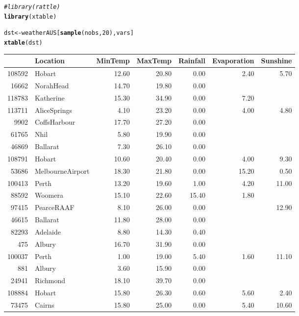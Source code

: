 \documentclass[a4paper]{article}\usepackage[]{graphicx}\usepackage[]{color}
\makeatletter
\newcommand{\hlnum}[1]{\textcolor[rgb]{0.686,0.059,0.569}{#1}}%
\newcommand{\hlcom}[1]{\textcolor[rgb]{0.678,0.584,0.686}{\textit{#1}}}%
\newcommand{\hlstd}[1]{\textcolor[rgb]{0.345,0.345,0.345}{#1}}%
\newcommand{\hlkwb}[1]{\textcolor[rgb]{0.69,0.353,0.396}{#1}}%
\newcommand{\hlkwd}[1]{\textcolor[rgb]{0.737,0.353,0.396}{\textbf{#1}}}%
\newenvironment{kframe}{%
 \def\at@end@of@kframe{}%
 \ifinner\ifhmode%
  \def\at@end@of@kframe{\end{minipage}}%
  \begin{minipage}{\columnwidth}%
 \fi\fi%
 \def\FrameCommand##1{\hskip\@totalleftmargin \hskip-\fboxsep
 \colorbox{shadecolor}{##1}\hskip-\fboxsep
     \hskip-\linewidth \hskip-\@totalleftmargin \hskip\columnwidth}%
 \MakeFramed {\advance\hsize-\width
   \@totalleftmargin\z@ \linewidth\hsize
   \@setminipage}}%
 {\par\unskip\endMakeFramed%
 \at@end@of@kframe}
\makeatother
\begin{document}
\begin{kframe}
\begin{alltt}
\hlcom{#library(rattle)}
\hlkwd{library}\hlstd{(xtable)}
\end{alltt}


{\ttfamily\noindent\color{warningcolor}{\#\# Warning: package 'xtable' was built under R version 3.2.5}}\begin{alltt}
\hlstd{dst} \hlkwb{<-} \hlstd{weatherAUS[}\hlkwd{sample}\hlstd{(nobs,} \hlnum{20}\hlstd{), vars]}
\hlkwd{xtable}\hlstd{(dst)}
\end{alltt}
\end{kframe}%
\begin{table}[ht]
\centering
\begin{tabular}{rlrrrrr}
  \hline
 & Location & MinTemp & MaxTemp & Rainfall & Evaporation & Sunshine \\ 
  \hline
108592 & Hobart & 12.60 & 20.80 & 0.00 & 2.40 & 5.70 \\ 
  16662 & NorahHead & 14.70 & 19.80 & 0.00 &  &  \\ 
  118783 & Katherine & 15.30 & 34.90 & 0.00 & 7.20 &  \\ 
  113711 & AliceSprings & 4.10 & 23.20 & 0.00 & 4.00 & 4.80 \\ 
  9902 & CoffsHarbour & 17.70 & 27.20 & 0.00 &  &  \\ 
  61765 & Nhil & 5.80 & 19.90 & 0.00 &  &  \\ 
  46869 & Ballarat & 7.30 & 26.10 & 0.00 &  &  \\ 
  108791 & Hobart & 10.60 & 20.40 & 0.00 & 4.00 & 9.30 \\ 
  53686 & MelbourneAirport & 18.30 & 21.80 & 0.00 & 15.20 & 0.50 \\ 
  100413 & Perth & 13.20 & 19.60 & 1.00 & 4.20 & 11.00 \\ 
  88592 & Woomera & 15.10 & 22.60 & 15.40 & 1.80 &  \\ 
  97415 & PearceRAAF & 8.10 & 26.00 & 0.00 &  & 12.90 \\ 
  46615 & Ballarat & 11.80 & 28.00 & 0.00 &  &  \\ 
  82293 & Adelaide & 8.80 & 14.30 & 0.40 &  &  \\ 
  475 & Albury & 16.70 & 31.90 & 0.00 &  &  \\ 
  100037 & Perth & 1.00 & 19.00 & 5.40 & 1.60 & 11.10 \\ 
  881 & Albury & 3.60 & 15.90 & 0.00 &  &  \\ 
  24941 & Richmond & 18.10 & 39.70 & 0.00 &  &  \\ 
  108884 & Hobart & 15.80 & 26.30 & 0.60 & 5.60 & 2.40 \\ 
  73475 & Cairns & 15.80 & 25.00 & 0.00 & 5.40 & 10.60 \\ 
   \hline
\end{tabular}
\end{table}
\end{document}

